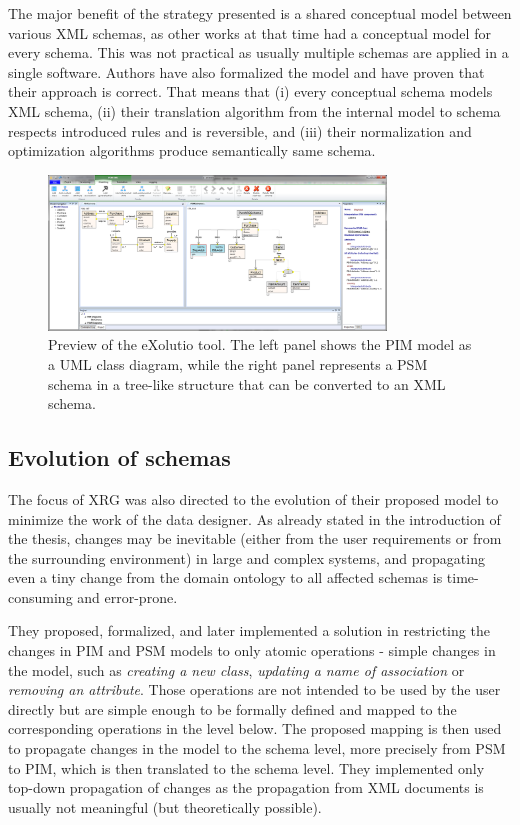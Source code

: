 The major benefit of the strategy presented is a shared conceptual model between various XML schemas, as other works at that time had a conceptual model for every schema. This was not practical as usually multiple schemas are applied in a single software. Authors have also formalized the model and have proven that their approach is correct. That means that (i) every conceptual schema models XML schema, (ii) their translation algorithm from the internal model to schema respects introduced rules and is reversible, and (iii) their normalization and optimization algorithms produce semantically same schema.

\begin{figure}[h!]
    \centering
    \includegraphics[width=0.8\textwidth]{img/exolutio.png}
    \caption{Preview of the eXolutio tool. The left panel shows the PIM model as a UML class diagram, while the right panel represents a PSM schema in a tree-like structure that can be converted to an XML schema.}
    \label{fig:exolutio}
\end{figure}

\subsection{Evolution of schemas}

The focus of XRG was also directed to the evolution \cite{nevcasky2012evolution} of their proposed model to minimize the work of the data designer. As already stated in the introduction of the thesis, changes may be inevitable (either from the user requirements or from the surrounding environment) in large and complex systems, and propagating even a tiny change from the domain ontology to all affected schemas is time-consuming and error-prone.

They proposed, formalized, and later implemented a solution in restricting the changes in PIM and PSM models to only atomic operations - simple changes in the model, such as \textit{creating a new class}, \textit{updating a name of association} or \textit{removing an attribute}. Those operations are not intended to be used by the user directly but are simple enough to be formally defined and mapped to the corresponding operations in the level below. The proposed mapping is then used to propagate changes in the model to the schema level, more precisely from PSM to PIM, which is then translated to the schema level. They implemented only top-down propagation of changes as the propagation from XML documents is usually not meaningful (but theoretically possible).

